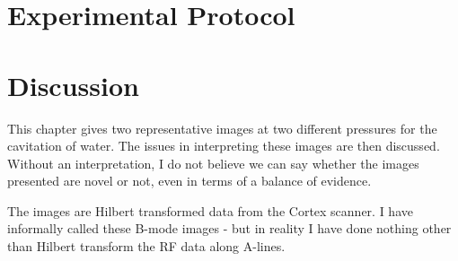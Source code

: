 


\section{Experimental Protocol}

\section{Discussion} \label{sec:WE:discussion}




This chapter gives two representative images at two different pressures for the cavitation of water.
The issues in interpreting these images are then discussed.
Without an interpretation, I do not believe we can say whether the images presented are novel or not, 
even in terms of a balance of evidence.

The images are Hilbert transformed data from the Cortex scanner.
I have informally called these B-mode images - but in reality I have done nothing other than  Hilbert transform the RF data along A-lines.








